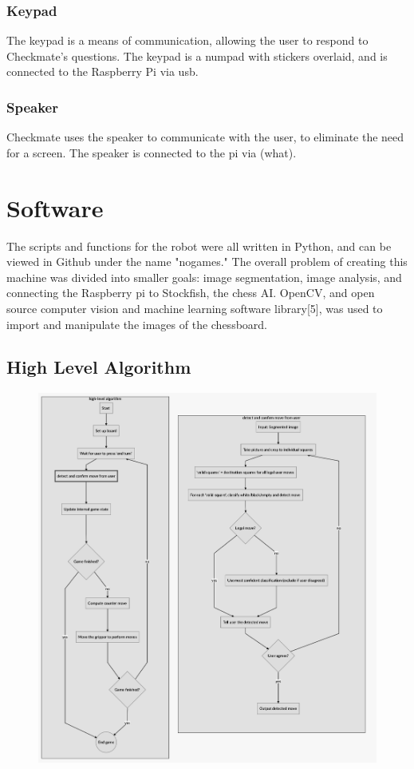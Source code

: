 \documentclass[onecolumn]{IEEEtran}
\begin{document}
\subsubsection{Keypad}
The keypad is a means of communication, allowing the user to respond to Checkmate's questions. The keypad is a numpad with stickers overlaid, and is connected to the Raspberry Pi via usb. 
\subsubsection{Speaker}
Checkmate uses the speaker to communicate with the user, to eliminate the need for a screen. The speaker is connected to the pi via (what). 
\section{Software}
The scripts and functions for the robot were all written in Python, and can be viewed in Github under the name "nogames." The overall problem of creating this machine was divided into smaller goals: image segmentation, image analysis, and connecting the Raspberry pi to Stockfish, the chess AI. OpenCV, and open source computer vision and machine learning software library[5], was used to import and manipulate the images of the chessboard. 

\subsection{High Level Algorithm}

\begin{figure}[h!]
  \centering
  \includegraphics[scale = .3]{white_square.png}
\end{figure}
\end{document}
